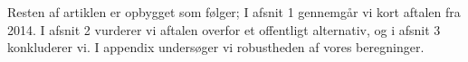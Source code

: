 \documentclass{article}
\begin{document}
Resten af artiklen er opbygget som følger; I afsnit 1 gennemgår vi kort aftalen fra 2014. I afsnit 2 vurderer vi aftalen overfor et offentligt alternativ, og i afsnit 3 konkluderer vi. I appendix undersøger vi robustheden af vores beregninger. 

%
%
%
\end{document}
